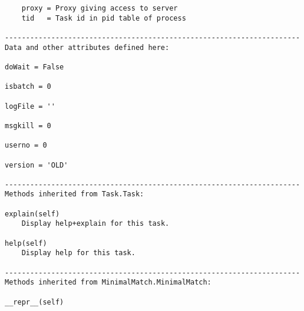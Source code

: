 \documentclass[11pt]{report}
\begin{document}
\begin{verbatim}
    proxy = Proxy giving access to server
    tid   = Task id in pid table of process

----------------------------------------------------------------------
Data and other attributes defined here:

doWait = False

isbatch = 0

logFile = ''

msgkill = 0

userno = 0

version = 'OLD'

----------------------------------------------------------------------
Methods inherited from Task.Task:

explain(self)
    Display help+explain for this task.

help(self)
    Display help for this task.

----------------------------------------------------------------------
Methods inherited from MinimalMatch.MinimalMatch:

__repr__(self)
\end{verbatim}
\end{document}
